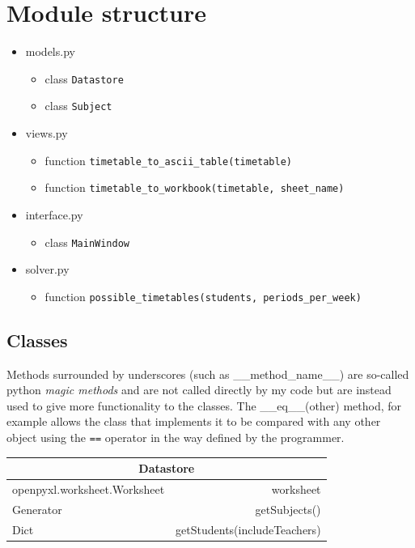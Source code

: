 \documentclass[12pt]{article}
\begin{document}
\section{Module structure}

\begin{itemize}
    \item models.py
        \begin{itemize}
            \item class \texttt{Datastore}
            \item class \texttt{Subject}
        \end{itemize}
    \item views.py
        \begin{itemize}
            \item function \texttt{timetable\_to\_ascii\_table(timetable)}
            \item function \texttt{timetable\_to\_workbook(timetable, sheet\_name)}
        \end{itemize}
    \item interface.py
        \begin{itemize}
            \item class \texttt{MainWindow}
        \end{itemize}
    \item solver.py
        \begin{itemize}
            \item function \texttt{possible\_timetables(students, periods\_per\_week)}
        \end{itemize}
\end{itemize}

\subsection{Classes}
Methods surrounded by underscores (such as \_\_method\_name\_\_) are so-called python
\emph{magic methods} and are not called directly by my code but are instead used to give
more functionality to the classes. The \_\_eq\_\_(other) method, for example allows the
class that implements it to be compared with any other object using the \texttt{==} operator
in the way defined by the programmer.

%
\begin{table}[H]
    \centering
\begin{tabular}{|l r|}
    \hline
    \multicolumn{2}{|c|}{Datastore}\\
    \hline
    \hline
    openpyxl.worksheet.Worksheet & worksheet\\
    \hline
    Generator\footnotemark & getSubjects()\\
    Dict      & getStudents(includeTeachers)\\
    \hline
\end{tabular}
\end{table}
%
\end{document}
